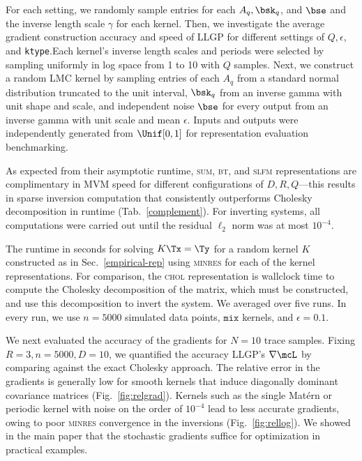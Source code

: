 \documentclass{article}
\begin{document}
For each setting, we randomly sample entries for each $A_q,\bsk_q$, and $\bse$ and the inverse length scale $\gamma$ for each kernel. Then, we investigate the average gradient construction accuracy and speed of LLGP for different settings of $Q,\epsilon$, and \texttt{ktype}.Each kernel's inverse length scales and periods were selected by sampling uniformly in log space from 1 to 10 with $Q$ samples. Next, we construct a random LMC kernel by sampling entries of each $A_q$ from a standard normal distribution truncated to the unit interval, $\bsk_q$ from an inverse gamma with unit shape and scale, and independent noise $\bse$ for every output from an inverse gamma with unit scale and mean $\epsilon$. Inputs and outputs were independently generated from $\Unif[0,1]$ for representation evaluation benchmarking.

As expected from their asymptotic runtime, \textsc{sum}, \textsc{bt}, and \textsc{slfm} representations are complimentary in MVM speed for different configurations of $D,R,Q$---this results in sparse inversion computation that consistently outperforms Cholesky decomposition in runtime (Tab.~\ref{complement}).
For inverting systems, all computations were carried out until the residual $\ell_2$ norm was at most $10^{-4}$.
\begin{table*}[!ht]
  \caption{The runtime in seconds for solving $K\Tx=\Ty$ for a random kernel $K$ constructed as in Sec.~\ref{empirical-rep} using \textsc{minres} for each of the kernel representations. For comparison, the \textsc{chol} representation is wallclock time to compute the Cholesky decomposition of the matrix, which must be constructed, and use this decomposition to invert the system. We averaged over five runs. In every run, we use $n=5000$ simulated data points, $\texttt{mix}$ kernels, and $\epsilon=0.1$.
}
\label{complement}
\begin{center}
  \begin{small}
    
\end{small}
\end{center}
\end{table*}

We next evaluated the accuracy of the gradients for $N=10$ trace samples. Fixing $R=3,n=5000,D=10$, we quantified the accuracy LLGP's $\nabla\mcL$ by comparing against the exact Cholesky approach. The relative error in the gradients is generally low for smooth kernels that induce diagonally dominant covariance matrices (Fig.~\ref{fig:relgrad}). Kernels such as the single Mat\'{e}rn or periodic kernel with noise on the order of $10^{-4}$ lead to less accurate gradients, owing to poor \textsc{minres} convergence in the inversions (Fig.~\ref{fig:rellog}). We showed in the main paper that the stochastic gradients suffice for optimization in practical examples.
\end{document}
